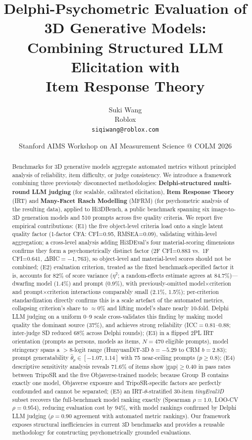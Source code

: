 \documentclass[10pt]{article}
\title{Delphi-Psychometric Evaluation of 3D Generative Models:\\
       Combining Structured LLM Elicitation with\\
       Item Response Theory}
\author{Suki Wang \\ Roblox \\ \texttt{siqiwang@roblox.com}}
\date{Stanford AIMS Workshop on AI Measurement Science @ COLM 2026}
\begin{document}
\maketitle

\begin{abstract}
Benchmarks for 3D generative models aggregate automated metrics without principled
analysis of reliability, item difficulty, or judge consistency.
We introduce a framework combining three previously disconnected methodologies:
\textbf{Delphi-structured multi-round LLM judging} (for scalable, calibrated elicitation),
\textbf{Item Response Theory} (IRT) and \textbf{Many-Facet Rasch Modelling} (MFRM)
(for psychometric analysis of the resulting data), applied to Hi3DBench, a
public benchmark spanning six image-to-3D generation models and 510 prompts
across five quality criteria.
We report five empirical contributions:
(E1) the five object-level criteria load onto a single latent quality factor
     (1-factor CFA: CFI=0.95, RMSEA=0.09), validating within-level
     aggregation; a cross-level analysis adding Hi3DEval's four
     material-scoring dimensions confirms they form a psychometrically
     distinct factor (2F CFI=0.883 vs.\ 1F CFI=0.641, $\Delta$BIC$=-1{,}763$),
     so object-level and material-level scores should not be combined;
(E2) evaluation criterion, treated as the fixed benchmark-specified factor it
     is, accounts for 82\% of score variance ($\eta^2$; a random-effects
     estimate agrees at 84.7\%)—dwarfing model (1.4\%) and prompt (0.9\%),
     with previously-omitted model$\times$criterion and prompt$\times$criterion
     interactions comparably small (2.1\%, 1.5\%); per-criterion standardization
     directly confirms this is a scale artefact of the automated metrics,
     collapsing criterion's share to $\approx$0\% and lifting model's share
     nearly 10-fold. Delphi LLM judging on a uniform 0--9 scale cross-validates
     this finding by making model quality the dominant source (37\%), and
     achieves strong reliability (ICC$=0.81$--$0.88$; inter-judge SD reduced
     68\% across Delphi rounds);
(E3) in a flipped 2PL IRT orientation (prompts as persons, models as items,
     $N=470$ eligible prompts), model stringency spans a $>8$-logit range
     (HunyuanDiT-3D $b=-5.29$ to CRM $b=2.83$); prompt generatability
     $\hat{\theta}_p\in[-1.07,1.14]$ with 75 near-ceiling prompts ($p\geq0.8$);
(E4) descriptive sensitivity analysis reveals 71.6\% of items show
     $|\text{gap}|\geq0.40$ in pass rates between TripoSR and the five
     Objaverse-trained models; because Group~B contains exactly one model,
     Objaverse exposure and TripoSR-specific factors are perfectly confounded
     and cannot be separated;
(E5) an IRT-$\theta$-stratified 30-item \emph{tinyEval3D} subset recovers the
     full-benchmark model ranking exactly (Spearman $\rho=1.0$, LOO-CV
     $\rho=0.954$), reducing evaluation cost by 94\%, with model rankings
     confirmed by Delphi LLM judging ($\rho=0.90$ agreement with automated
     metric rankings).
Our framework exposes structural inefficiencies in current 3D benchmarks and
provides a reusable methodology for constructing psychometrically grounded
evaluations.
\end{abstract}
\end{document}
